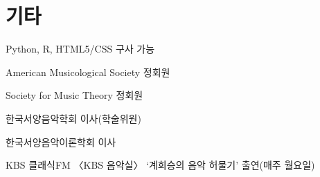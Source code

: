 \documentclass[dvipdfmx,a4paper]{article}
\begin{document}
  \vspace{2.5mm}
  
  \section*{\normalsize 기타}
  
  \noindent \hspace{2mm} \textbullet \hspace{2mm} Python, R, HTML5/CSS 구사 가능
  
  \noindent \hspace{2mm} \textbullet \hspace{2mm} American Musicological Society 정회원
  
  \noindent \hspace{2mm} \textbullet \hspace{2mm} Society for Music Theory 정회원
  
  \noindent \hspace{2mm} \textbullet \hspace{2mm} 한국서양음악학회 이사(학술위원)
  
  \noindent \hspace{2mm} \textbullet \hspace{2mm} 한국서양음악이론학회 이사
  
  \noindent \hspace{2mm} \textbullet \hspace{2mm} KBS 클래식FM 〈KBS 음악실〉 ‘계희승의 음악 허물기’ 출연(매주 월요일)
\end{document}
